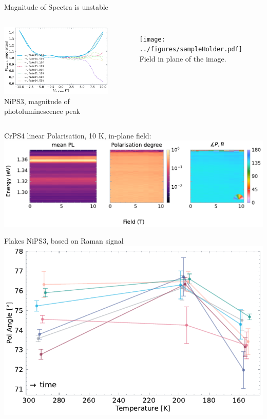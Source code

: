 \documentclass[
	10pt,
]{beamer}
\begin{document}
\begin{frame}{Magnitude of Spectra is unstable}
	\begin{columns}
		\centering
		\includegraphics[width=\textwidth]{../figures/2023-12-10 lens movement.pdf}
		NiPS3, magnitude of photoluminescence peak

		\begin{figure}
			\centering
			\texttt{[image: ../figures/sampleHolder.pdf]}
			Field in plane of the image.
		\end{figure}
	\end{columns}
\end{frame}

\begin{frame}{CrPS4}
	linear Polarisation, 10 K, in-plane field:
	\includegraphics[width=\textwidth]{../figures/2024-04-09 CrPS4 linear Polarisation.pdf}
\end{frame}

\begin{frame}{Flakes NiPS3, based on Raman signal}
	\includegraphics[width=\textwidth]{../figures/2024-01-03 NiPS3 flake rotation.pdf}
\end{frame}
\end{document}
